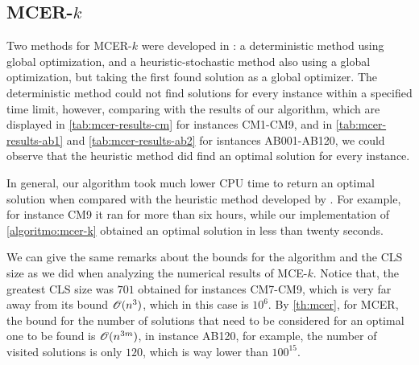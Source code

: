 \subsection{MCER-$k$}

Two methods for MCER-$k$ were developed in : a deterministic method using global optimization, and a heuristic-stochastic method also using a global optimization, but taking the first found solution as a global optimizer.
The deterministic method could not find solutions for every instance within a specified time limit, however, comparing with the results of our algorithm, which are displayed in \autoref{tab:mcer-results-cm} for instances CM1-CM9, and in \autoref{tab:mcer-results-ab1} and \autoref{tab:mcer-results-ab2} for isntances AB001-AB120, we could observe that the heuristic method did find an optimal solution for every instance.

In general, our algorithm took much lower CPU time to return an optimal solution when compared with the heuristic method developed by . For example, for instance CM9 it ran for more than six hours, while our implementation of \autoref{algoritmo:mcer-k} obtained an optimal solution in less than twenty seconds.

We can give the same remarks about the bounds for the algorithm and the CLS size as we did when analyzing the numerical results of MCE-$k$. Notice that, the greatest CLS size was $701$ obtained for instances CM7-CM9, which is very far away from its bound $\mathscr{O}(n^3)$, which in this case is $10^6$. By \autoref{th:mcer}, for MCER, the bound for the number of solutions that need to be considered for an optimal one to be found is $\mathscr{O}(n^{3m})$, in instance AB120, for example, the number of visited solutions is only $120$, which is way lower than $100^{15}$.

